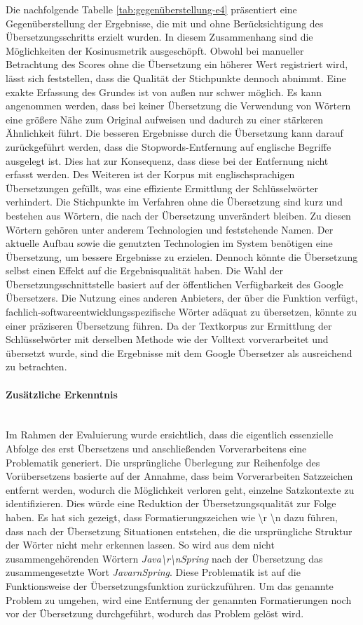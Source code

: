 Die nachfolgende Tabelle \ref{tab:gegenüberstellung-e4} präsentiert eine Gegenüberstellung der Ergebnisse, die mit und ohne Berücksichtigung des Übersetzungsschritts erzielt wurden. In diesem Zusammenhang sind die Möglichkeiten der Kosinusmetrik ausgeschöpft. Obwohl bei manueller Betrachtung des Scores ohne die Übersetzung ein höherer Wert registriert wird, lässt sich feststellen, dass die Qualität der Stichpunkte dennoch abnimmt. Eine exakte Erfassung des Grundes ist von außen nur schwer möglich. Es kann angenommen werden, dass bei keiner Übersetzung die Verwendung von Wörtern eine größere Nähe zum Original aufweisen und dadurch zu einer stärkeren Ähnlichkeit führt. Die besseren Ergebnisse durch die Übersetzung kann darauf zurückgeführt werden, dass die Stopwords-Entfernung auf englische Begriffe ausgelegt ist. Dies hat zur Konsequenz, dass diese bei der Entfernung nicht erfasst werden. Des Weiteren ist der Korpus mit englischsprachigen Übersetzungen gefüllt, was eine effiziente Ermittlung der Schlüsselwörter verhindert. Die Stichpunkte im Verfahren ohne die Übersetzung sind kurz und bestehen aus Wörtern, die nach der Übersetzung unverändert bleiben. Zu diesen Wörtern gehören unter anderem Technologien und feststehende Namen. Der aktuelle Aufbau sowie die genutzten Technologien im System benötigen eine Übersetzung, um bessere Ergebnisse zu erzielen. Dennoch könnte die Übersetzung selbst einen Effekt auf die Ergebnisqualität haben. Die Wahl der Übersetzungsschnittstelle basiert auf der öffentlichen Verfügbarkeit des Google Übersetzers. Die Nutzung eines anderen Anbieters, der über die Funktion verfügt, fachlich-softwareentwicklungsspezifische Wörter adäquat zu übersetzen, könnte zu einer präziseren Übersetzung führen. Da der Textkorpus zur Ermittlung der Schlüsselwörter mit derselben Methode wie der Volltext vorverarbeitet und übersetzt wurde, sind die Ergebnisse mit dem Google Übersetzer als ausreichend zu betrachten.
\paragraph{Zusätzliche Erkenntnis}\mbox{}\\
Im Rahmen der Evaluierung wurde ersichtlich, dass die eigentlich essenzielle Abfolge des erst Übersetzens und anschließenden Vorverarbeitens eine Problematik generiert. Die ursprüngliche Überlegung zur Reihenfolge des Vorübersetzens basierte auf der Annahme, dass beim Vorverarbeiten Satzzeichen entfernt werden, wodurch die Möglichkeit verloren geht, einzelne Satzkontexte zu identifizieren. Dies würde eine Reduktion der Übersetzungsqualität zur Folge haben. Es hat sich gezeigt, dass Formatierungszeichen wie \textbackslash r \textbackslash n dazu führen, dass nach der Übersetzung Situationen entstehen, die die ursprüngliche Struktur der Wörter nicht mehr erkennen lassen. So wird aus dem nicht zusammengehörenden Wörtern \emph{Java\textbackslash r\textbackslash nSpring} nach der Übersetzung das zusammengesetzte Wort \emph{JavarnSpring}. Diese Problematik ist auf die Funktionsweise der Übersetzungsfunktion zurückzuführen. Um das genannte Problem zu umgehen, wird eine Entfernung der genannten Formatierungen noch vor der Übersetzung durchgeführt, wodurch das Problem gelöst wird.\\

